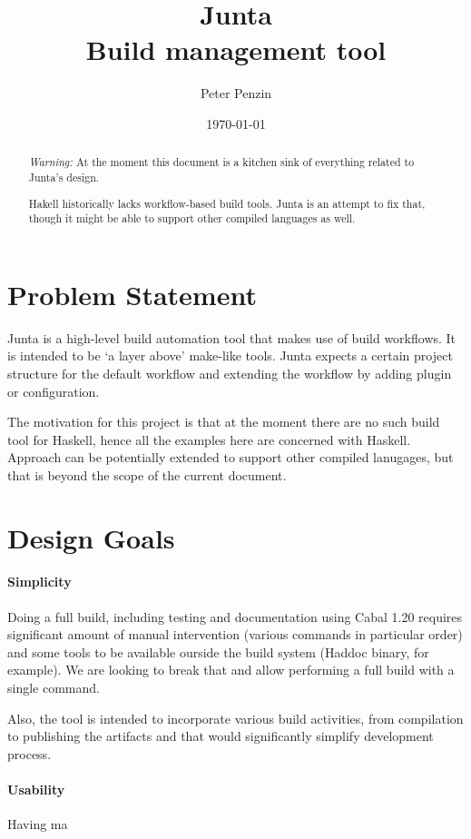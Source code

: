 \documentclass[11pt]{article}
\title{Junta\\Build management tool}
\author{Peter Penzin}
\date{\today}
\begin{document}
\maketitle

\begin{abstract}

\textit{Warning:} At the moment this document is a kitchen sink of everything
related to Junta's design. 

Hakell historically lacks workflow-based build tools. Junta is an attempt to
fix that, though it might be able to support other compiled languages as well.

\end{abstract}

\section{Problem Statement}
Junta is a high-level build automation tool that makes use of build workflows.
It is intended to be `a layer above' make-like tools. Junta expects a certain
project structure for the default workflow and extending the workflow by adding
plugin or configuration.

The motivation for this project is that at the moment there are no such build
tool for Haskell, hence all the examples here are concerned with Haskell.
Approach can be potentially extended to support other compiled lanugages, but
that is beyond the scope of the current document.

\section{Design Goals}

\paragraph{Simplicity}
Doing a full build, including testing and documentation using Cabal 1.20
requires significant amount of manual intervention (various commands in
particular order) and some tools to be available ourside the build system
(Haddoc binary, for example). We are looking to break that and allow performing
a full build with a single command.

Also, the tool is intended to incorporate various build activities, from
compilation to publishing the artifacts and that would significantly simplify
development process.

\paragraph{Usability}
Having ma
\end{document}
